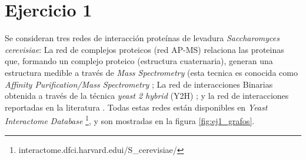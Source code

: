 
\section{Ejercicio 1}

Se consideran tres redes de interacci\'on prote\'inas de levadura \textit{Saccharomyces cerevisiae}: 
La red de complejos proteicos (red AP-MS) relaciona las proteinas que, formando un complejo proteico
(estructura cuaternaria), generan una estructura medible a trav\'es de \textit{Mass Spectrometry} 
(esta tecnica es conocida como \textit{Affinity Purification/Mass Spectrometry}  \citep{apms_data}; 
La red de interacciones Binarias obtenida a trav\'es de la t\'ecnica \textit{yeast 2 hybrid} 
(Y2H) \citep{y2h_data}; y la red de interacciones reportadas en la literatura \citep{lit_data}.
Todas estas redes est\'an disponibles en \textit{Yeast Interactome Database}
\footnote{interactome.dfci.harvard.edui/S\_cerevisiae/}, y son 
mostradas en la figura \ref{fig:ej1_grafos}.



